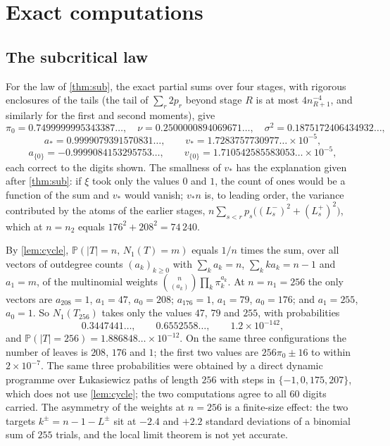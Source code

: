\documentclass[11pt]{amsart}
\theoremstyle{definition}
\newcommand{\Prob}{\mathbb{P}}
\begin{document}
\section{Exact computations}\label{sec:num}

\subsection{The subcritical law}

For the law of \cref{thm:sub}, the exact partial sums over four stages, with rigorous enclosures of the tails (the tail of $\sum_r2p_r$ beyond stage $R$ is at most $4n_{R+1}^{-4}$, and similarly for the first and second moments), give
\[
\pi_0=0.7499999995343387\ldots,\quad
\nu=0.2500000894069671\ldots,\quad
\sigma^2=0.1875172406434932\ldots,
\]
\[
a_*=0.9999079391570831\ldots,\qquad
v_*=1.7283757730977\ldots\times10^{-5},
\]
\[
a_{\{0\}}=-0.9999084153295753\ldots,\qquad
v_{\{0\}}=1.710542585583053\ldots\times10^{-5},
\]
each correct to the digits shown. The smallness of $v_*$ has the explanation given after \cref{thm:sub}: if $\xi$ took only the values $0$ and $1$, the count of ones would be a function of the sum and $v_*$ would vanish; $v_*n$ is, to leading order, the variance contributed by the atoms of the earlier stages, $n\sum_{s<r}p_s\big((L_s^-)^2+(L_s^+)^2\big)$, which at $n=n_2$ equals $176^2+208^2=74\,240$.

By \cref{lem:cycle}, $\Prob(|T|=n,\,N_1(T)=m)$ equals $1/n$ times the sum, over all vectors of outdegree counts $(a_k)_{k\ge0}$ with $\sum_ka_k=n$, $\sum_kka_k=n-1$ and $a_1=m$, of the multinomial weights $\binom{n}{(a_k)}\prod_k\pi_k^{a_k}$. At $n=n_1=256$ the only vectors are $a_{208}=1$, $a_1=47$, $a_0=208$; $a_{176}=1$, $a_1=79$, $a_0=176$; and $a_1=255$, $a_0=1$. So $N_1(T_{256})$ takes only the values $47$, $79$ and $255$, with probabilities
\[
0.3447441\ldots,\qquad0.6552558\ldots,\qquad1.2\times10^{-142},
\]
and $\Prob(|T|=256)=1.886848\ldots\times10^{-12}$. On the same three configurations the number of leaves is $208$, $176$ and $1$; the first two values are $256\pi_0\pm16$ to within $2\times10^{-7}$. The same three probabilities were obtained by a direct dynamic programme over \L ukasiewicz paths of length $256$ with steps in $\{-1,0,175,207\}$, which does not use \cref{lem:cycle}; the two computations agree to all $60$ digits carried. The asymmetry of the weights at $n=256$ is a finite-size effect: the two targets $k^\pm=n-1-L^\pm$ sit at $-2.4$ and $+2.2$ standard deviations of a binomial sum of $255$ trials, and the local limit theorem is not yet accurate.
\end{document}
